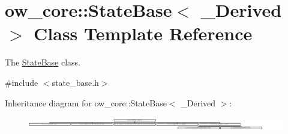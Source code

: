 \hypertarget{classow__core_1_1StateBase}{}\section{ow\+\_\+core\+:\+:State\+Base$<$ \+\_\+\+Derived $>$ Class Template Reference}
\label{classow__core_1_1StateBase}


The \hyperlink{classow__core_1_1StateBase}{State\+Base} class.  




{\ttfamily \#include $<$state\+\_\+base.\+h$>$}

Inheritance diagram for ow\+\_\+core\+:\+:State\+Base$<$ \+\_\+\+Derived $>$\+:\begin{figure}[H]
\begin{center}
\leavevmode
\includegraphics[height=0.571429cm]{d5/dca/classow__core_1_1StateBase}
\end{center}
\end{figure}
